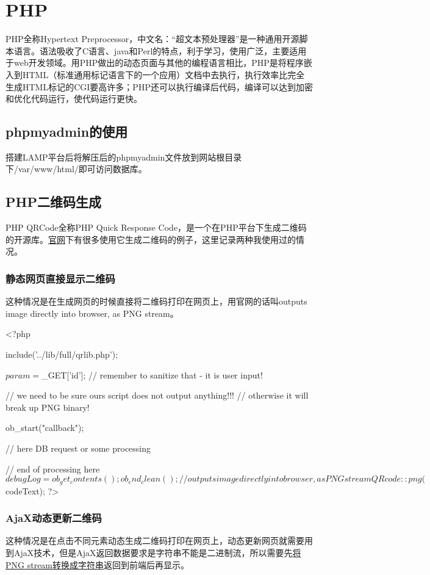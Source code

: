 \section{PHP}
PHP全称Hypertext Preprocessor，中文名：“超文本预处理器”是一种通用开源脚本语言。语法吸收了C语言、java和Perl的特点，利于学习，使用广泛，主要适用于web开发领域。用PHP做出的动态页面与其他的编程语言相比，PHP是将程序嵌入到HTML（标准通用标记语言下的一个应用）文档中去执行，执行效率比完全生成HTML标记的CGI要高许多；PHP还可以执行编译后代码，编译可以达到加密和优化代码运行，使代码运行更快。
\subsection{phpmyadmin的使用}
搭建LAMP平台后将解压后的phpmyadmin文件放到网站根目录下/var/www/html/即可访问数据库。
\subsection{PHP二维码生成}
PHP QRCode全称PHP Quick Response Code，是一个在PHP平台下生成二维码的开源库。\href{https://phpqrcode.sourceforge.net/}{官网}下有很多使用它生成二维码的例子，这里记录两种我使用过的情况。
\subsubsection{静态网页直接显示二维码}
这种情况是在生成网页的时候直接将二维码打印在网页上，用官网的话叫outputs image directly into browser, as PNG stream。
\begin{shell}
 <?php

    include('../lib/full/qrlib.php');
        
    $param = $_GET['id']; // remember to sanitize that - it is user input!
    
    // we need to be sure ours script does not output anything!!!
    // otherwise it will break up PNG binary!
    
    ob_start("callback");
    
    // here DB request or some processing
    
    // end of processing here
    $debugLog = ob_get_contents();
    ob_end_clean();
    
    // outputs image directly into browser, as PNG stream
    QRcode::png($codeText); 
?>
\end{shell}
\subsubsection{AjaX动态更新二维码}
这种情况是在点击不同元素动态生成二维码打印在网页上，动态更新网页就需要用到AjaX技术，但是AjaX返回数据要求是字符串不能是二进制流，所以需要先\href{https://blog.csdn.net/LJFPHP/article/details/79111844}{将PNG stream转换成字符串}返回到前端后再显示。
